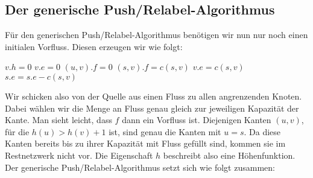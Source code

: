 \documentclass[12pt,a4paper,titlepage,onecolumn,ngerman,bibliography=totocnumbered]{scrartcl}
\theoremstyle{definition}
\theoremstyle{remark}
\newcommand{\pr}{Push/Relabel}
\begin{document}
\subsection{Der generische \pr -Algorithmus}
Für den generischen \pr -Algorithmus benötigen wir nun nur noch einen initialen Vorfluss.
Diesen erzeugen wir wie folgt:
\begin{algorithm}[H]
    \caption{Initialize-Preflow(G,s)}
    \label{alg:initialize_preflow}
\begin{algorithmic}[1]
    \State $v.h = 0$
    \State $v.e = 0$
\EndFor
{}
    \State $(u,v).f = 0$
\EndFor
{}
    \State $(s,v).f = c(s,v)$
    \State $v.e = c(s,v)$
    \State $s.e = s.e - c(s,v)$
\EndFor
\end{algorithmic}
\end{algorithm}
Wir schicken also von der Quelle aus einen Fluss zu allen angrenzenden Knoten.
Dabei wählen wir die Menge an Fluss genau gleich zur jeweiligen Kapazität der Kante.
Man sieht leicht, dass $f$ dann ein Vorfluss ist.
Diejenigen Kanten $(u,v)$, für die $h(u) > h(v) + 1$ ist, sind genau die Kanten mit $u = s$.
Da diese Kanten bereits bis zu ihrer Kapazität mit Fluss gefüllt sind, kommen sie im Restnetzwerk nicht vor.
Die Eigenschaft $h$ beschreibt also eine Höhenfunktion.
\medbreak
Der generische \pr -Algorithmus setzt sich wie folgt zusammen:
\begin{algorithm}[H]
    \caption{Generic-\pr}
    \label{alg:generic_pr}
\begin{algorithmic}[1]
\EndWhile
\end{algorithmic}
\end{algorithm}
\newpage
\printbibliography
\end{document}
